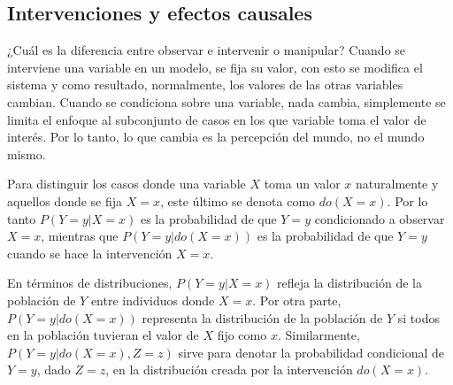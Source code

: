 

\subsection{Intervenciones y efectos causales}

¿Cuál es la diferencia entre observar e intervenir o
manipular? 
Cuando se interviene una variable en un modelo, se fija su valor, con esto se modifica el sistema y como resultado, normalmente, los valores de las otras variables cambian.
Cuando se condiciona sobre una variable, nada cambia, simplemente se limita el enfoque al subconjunto de casos en los que variable toma el valor de interés. 
Por lo tanto, lo que cambia es la percepción del mundo, no el mundo mismo.

Para distinguir los casos donde una variable $X$ toma un valor $x$ naturalmente
y aquellos donde se fija $X = x$, este último se denota como $do(X=x)$.
Por lo tanto $P(Y=y|X=x)$ es la probabilidad de que $Y = y$ condicionado a 
observar $X=x$, mientras que $P(Y=y|do(X=x))$ es la  probabilidad de que $Y=y$
cuando se hace la intervención $X=x$.


En términos de distribuciones, $P(Y = y|X = x)$ refleja la distribución 
de la población de $Y$ entre individuos donde $X=x$.
Por otra parte, $P(Y = y|do(X = x))$ representa la distribución de
la población de $Y$ si todos en la población tuvieran el valor de $X$ fijo como
$x$.
Similarmente, $P(Y = y|do(X = x), Z = z)$ sirve para denotar
la probabilidad condicional de $Y = y$, dado $Z = z$, 
en la distribución creada por la intervención $do(X = x)$.


